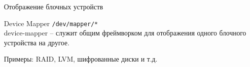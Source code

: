\begin{frame}{Отображение блочных устройств}


	\begin{block}{Device Mapper}
			{\tt /dev/mapper/*}\\
			device-mapper -- служит общим фреймворком для отображения одного блочного устройства на другое.

			Примеры: RAID, LVM, шифрованные диски и т.д.
	\end{block}

\end{frame}



